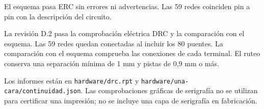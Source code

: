 El esquema pasa ERC sin errores ni advertencias. Las 59 redes coinciden pin a pin con la descripción del circuito.

La revisión D.2 pasa la comprobación eléctrica DRC y la comparación con el esquema. Las 59 redes quedan conectadas al incluir los 80 puentes. La comparación con el esquema comprueba las conexiones de cada terminal. El ruteo conserva una separación mínima de 1 mm y pistas de 0,9 mm o más.

Los informes están en \texttt{hardware/drc.rpt} y \texttt{hardware/una-cara/continuidad.json}. Las comprobaciones gráficas de serigrafía no se utilizan para certificar una impresión; no se incluye una capa de serigrafía en fabricación.
